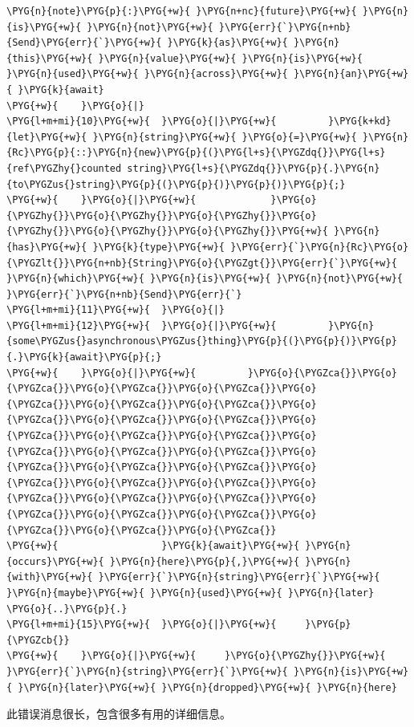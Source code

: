 \begin{Verbatim}[commandchars=\\\{\},breaklines=true,breakanywhere=true,fontsize=\codefont,xleftmargin=17bp]
\PYG{n}{note}\PYG{p}{:}\PYG{+w}{ }\PYG{n+nc}{future}\PYG{+w}{ }\PYG{n}{is}\PYG{+w}{ }\PYG{n}{not}\PYG{+w}{ }\PYG{err}{`}\PYG{n+nb}{Send}\PYG{err}{`}\PYG{+w}{ }\PYG{k}{as}\PYG{+w}{ }\PYG{n}{this}\PYG{+w}{ }\PYG{n}{value}\PYG{+w}{ }\PYG{n}{is}\PYG{+w}{ }\PYG{n}{used}\PYG{+w}{ }\PYG{n}{across}\PYG{+w}{ }\PYG{n}{an}\PYG{+w}{ }\PYG{k}{await}
\PYG{+w}{    }\PYG{o}{|}
\PYG{l+m+mi}{10}\PYG{+w}{  }\PYG{o}{|}\PYG{+w}{         }\PYG{k+kd}{let}\PYG{+w}{ }\PYG{n}{string}\PYG{+w}{ }\PYG{o}{=}\PYG{+w}{ }\PYG{n}{Rc}\PYG{p}{::}\PYG{n}{new}\PYG{p}{(}\PYG{l+s}{\PYGZdq{}}\PYG{l+s}{ref\PYGZhy{}counted string}\PYG{l+s}{\PYGZdq{}}\PYG{p}{.}\PYG{n}{to\PYGZus{}string}\PYG{p}{(}\PYG{p}{)}\PYG{p}{)}\PYG{p}{;}
\PYG{+w}{    }\PYG{o}{|}\PYG{+w}{             }\PYG{o}{\PYGZhy{}}\PYG{o}{\PYGZhy{}}\PYG{o}{\PYGZhy{}}\PYG{o}{\PYGZhy{}}\PYG{o}{\PYGZhy{}}\PYG{o}{\PYGZhy{}}\PYG{+w}{ }\PYG{n}{has}\PYG{+w}{ }\PYG{k}{type}\PYG{+w}{ }\PYG{err}{`}\PYG{n}{Rc}\PYG{o}{\PYGZlt{}}\PYG{n+nb}{String}\PYG{o}{\PYGZgt{}}\PYG{err}{`}\PYG{+w}{ }\PYG{n}{which}\PYG{+w}{ }\PYG{n}{is}\PYG{+w}{ }\PYG{n}{not}\PYG{+w}{ }\PYG{err}{`}\PYG{n+nb}{Send}\PYG{err}{`}
\PYG{l+m+mi}{11}\PYG{+w}{  }\PYG{o}{|}
\PYG{l+m+mi}{12}\PYG{+w}{  }\PYG{o}{|}\PYG{+w}{         }\PYG{n}{some\PYGZus{}asynchronous\PYGZus{}thing}\PYG{p}{(}\PYG{p}{)}\PYG{p}{.}\PYG{k}{await}\PYG{p}{;}
\PYG{+w}{    }\PYG{o}{|}\PYG{+w}{         }\PYG{o}{\PYGZca{}}\PYG{o}{\PYGZca{}}\PYG{o}{\PYGZca{}}\PYG{o}{\PYGZca{}}\PYG{o}{\PYGZca{}}\PYG{o}{\PYGZca{}}\PYG{o}{\PYGZca{}}\PYG{o}{\PYGZca{}}\PYG{o}{\PYGZca{}}\PYG{o}{\PYGZca{}}\PYG{o}{\PYGZca{}}\PYG{o}{\PYGZca{}}\PYG{o}{\PYGZca{}}\PYG{o}{\PYGZca{}}\PYG{o}{\PYGZca{}}\PYG{o}{\PYGZca{}}\PYG{o}{\PYGZca{}}\PYG{o}{\PYGZca{}}\PYG{o}{\PYGZca{}}\PYG{o}{\PYGZca{}}\PYG{o}{\PYGZca{}}\PYG{o}{\PYGZca{}}\PYG{o}{\PYGZca{}}\PYG{o}{\PYGZca{}}\PYG{o}{\PYGZca{}}\PYG{o}{\PYGZca{}}\PYG{o}{\PYGZca{}}\PYG{o}{\PYGZca{}}\PYG{o}{\PYGZca{}}\PYG{o}{\PYGZca{}}\PYG{o}{\PYGZca{}}
\PYG{+w}{                  }\PYG{k}{await}\PYG{+w}{ }\PYG{n}{occurs}\PYG{+w}{ }\PYG{n}{here}\PYG{p}{,}\PYG{+w}{ }\PYG{n}{with}\PYG{+w}{ }\PYG{err}{`}\PYG{n}{string}\PYG{err}{`}\PYG{+w}{ }\PYG{n}{maybe}\PYG{+w}{ }\PYG{n}{used}\PYG{+w}{ }\PYG{n}{later}
\PYG{o}{..}\PYG{p}{.}
\PYG{l+m+mi}{15}\PYG{+w}{  }\PYG{o}{|}\PYG{+w}{     }\PYG{p}{\PYGZcb{}}
\PYG{+w}{    }\PYG{o}{|}\PYG{+w}{     }\PYG{o}{\PYGZhy{}}\PYG{+w}{ }\PYG{err}{`}\PYG{n}{string}\PYG{err}{`}\PYG{+w}{ }\PYG{n}{is}\PYG{+w}{ }\PYG{n}{later}\PYG{+w}{ }\PYG{n}{dropped}\PYG{+w}{ }\PYG{n}{here}
\end{Verbatim}

此错误消息很长，包含很多有用的详细信息。

